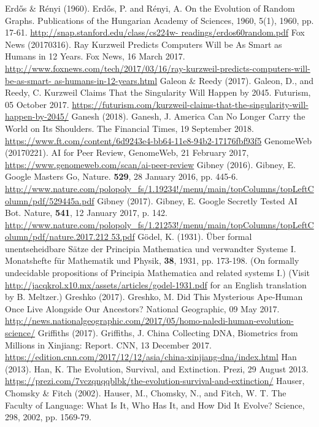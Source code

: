 \begin{multicols}{2}
\begin{thebibliography}{99}
 Erdős \& Rényi (1960). Erdős, P. and Rényi, A. On the Evolution of Random Graphs. Publications of the Hungarian Academy of Sciences, 1960, 5(1), 1960, pp. 17-61. \url{http://snap.stanford.edu/class/cs224w- readings/erdos60random.pdf}
 Fox News (20170316). Ray Kurzweil Predicts Computers Will be As Smart as Humans in 12 Years. Fox News, 16 March 2017. \url{http://www.foxnews.com/tech/2017/03/16/ray-kurzweil-predicts-computers-will-be-as-smart- as-humans-in-12-years.html}
 Galeon \& Reedy (2017). Galeon, D., and Reedy, C. Kurzweil Claims That the Singularity Will Happen by 2045. Futurism, 05 October 2017. \url{https://futurism.com/kurzweil-claims-that-the-singularity-will-happen-by-2045/}
 Ganesh (2018). Ganesh, J. America Can No Longer Carry the World on Its Shoulders. The Financial Times, 19 September 2018. \url{https://www.ft.com/content/6d9243e4-bb64-11e8-94b2-17176fbf93f5}
 GenomeWeb (20170221). AI for Peer Review, GenomeWeb, 21 February 2017, \url{https://www.genomeweb.com/scan/ai-peer-review}
 Gibney (2016). Gibney, E. Google Masters Go, Nature. \textbf{529}, 28 January 2016, pp. 445-6. \url{http://www.nature.com/polopoly_fs/1.19234!/menu/main/topColumns/topLeftColumn/pdf/529445a.pdf}
 Gibney (2017). Gibney, E. Google Secretly Tested AI Bot. Nature, \textbf{541}, 12 January 2017, p. 142. \url{http://www.nature.com/polopoly_fs/1.21253!/menu/main/topColumns/topLeftColumn/pdf/nature.2017.212 53.pdf}
 Gödel, K. (1931). Über formal unentseheidbare Sätze der Principia Mathematica und verwandter Systeme I. Monatshefte für Mathematik und Physik, \textbf{38}, 1931, pp. 173-198. (On formally undecidable propositions of Principia Mathematica and related systems I.) (Visit \url{http://jacqkrol.x10.mx/assets/articles/godel-1931.pdf} for an English translation by B. Meltzer.)
 Greshko (2017). Greshko, M. Did This Mysterious Ape-Human Once Live Alongside Our Ancestors? National Geographic, 09 May 2017. \url{http://news.nationalgeographic.com/2017/05/homo-naledi-human-evolution-science/}
 Griffiths (2017). Griffiths, J. China Collecting DNA, Biometrics from Millions in Xinjiang: Report. CNN, 13 December 2017. \url{https://edition.cnn.com/2017/12/12/asia/china-xinjiang-dna/index.html}
 Han (2013). Han, K. The Evolution, Survival, and Extinction. Prezi, 29 August 2013. \url{https://prezi.com/7vczqnqqblbk/the-evolution-survival-and-extinction/}
 Hauser, Chomsky \& Fitch (2002). Hauser, M., Chomsky, N., and Fitch, W. T. The Faculty of Language: What Is It, Who Has It, and How Did It Evolve? Science, 298, 2002, pp. 1569-79.

\end{thebibliography}
\end{multicols}
